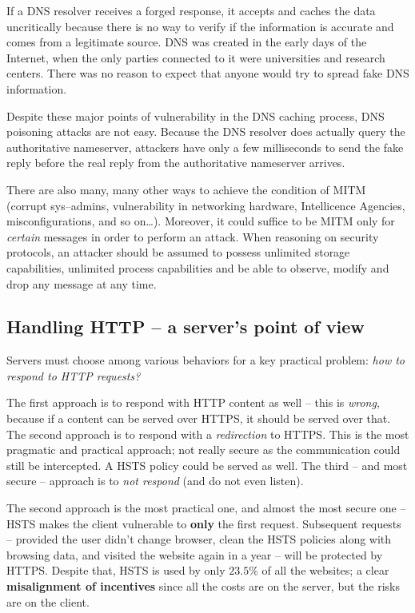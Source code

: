\documentclass[10pt]{extbook}
\begin{document}
If a DNS resolver receives a forged response, it accepts and caches the data
uncritically because there is no way to verify if the information is accurate
and comes from a legitimate source. DNS was created in the early days of the
Internet, when the only parties connected to it were universities and research
centers. There was no reason to expect that anyone would try to spread fake DNS
information.

Despite these major points of vulnerability in the DNS caching process, DNS
poisoning attacks are not easy. Because the DNS resolver does actually query
the authoritative nameserver, attackers have only a few milliseconds to send
the fake reply before the real reply from the authoritative nameserver arrives.

There are also many, many other ways to achieve the condition of MITM (corrupt
sys--admins, vulnerability in networking hardware, Intellicence Agencies,
misconfigurations, and so on\dots). Moreover, it could suffice to be MITM only
for \emph{certain} messages in order to perform an attack. When reasoning on
security protocols, an attacker should be assumed to possess unlimited storage
capabilities, unlimited process capabilities and be able to observe, modify and
drop any message at any time.

\subsection{Handling HTTP -- a server's point of view}

Servers must choose among various behaviors for a key practical problem:
\emph{how to respond to HTTP requests?}

The first approach is to respond with HTTP content as well -- this is
\emph{wrong}, because if a content can be served over HTTPS, it should be
served over that. The second approach is to respond with a \emph{redirection}
to HTTPS. This is the most pragmatic and practical approach; not really secure
as the communication could still be intercepted. A HSTS policy could be served
as well. The third -- and most secure -- approach is to \emph{not respond} (and
do not even listen).

The second approach is the most practical one, and almost the most secure one
-- HSTS makes the client vulnerable to \textbf{only} the first request.
Subsequent requests -- provided the user didn't change browser, clean the HSTS
policies along with browsing data, and visited the website again in a year --
will be protected by HTTPS. Despite that, HSTS is used by only $23.5\%$ of all
the websites; a clear \textbf{misalignment of incentives} since all the costs
are on the server, but the risks are on the client.
\end{document}
